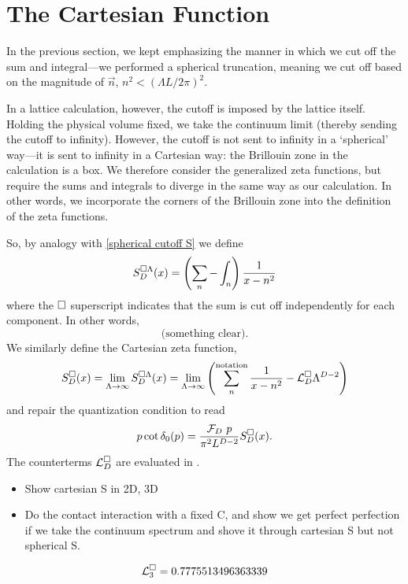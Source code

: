 \section{The Cartesian Function}\label{sec:cartesian}

In the previous section, we kept emphasizing the manner in which we cut off the sum and integral---we performed a spherical truncation, meaning we cut off based on the magnitude of $\vec{n}$, $n^2 < (\Lambda L/2\pi)^2$.

In a lattice calculation, however, the cutoff is imposed by the lattice itself.
Holding the physical volume fixed, we take the continuum limit (thereby sending the cutoff to infinity).
However, the cutoff is not sent to infinity in a `spherical' way---it is sent to infinity in a Cartesian way: the Brillouin zone in the calculation is a box.
We therefore consider the generalized zeta functions, but require the sums and integrals to diverge in the same way as our calculation.
In other words, we incorporate the corners of the Brillouin zone into the definition of the zeta functions.

So, by analogy with \eqref{spherical cutoff S} we define
\begin{equation}
        S^{\square\Lambda}_D(x) = \left(\sum_n- \int_n\right) \frac{1}{x-n^2}
\end{equation}
where the $\square$ superscript indicates that the sum is cut off independently for each component.  In other words,
\begin{equation}
    \text{(something clear)}.
\end{equation}
We similarly define the Cartesian zeta function,
\begin{equation}
    S^{\square}_D(x)
    =
    \lim_{\Lambda\rightarrow\infty} S^{\square\Lambda}_D(x)
    =
    \lim_{\Lambda\rightarrow\infty}\left( \sum_n^{\text{notation}} \frac{1}{x-n^2} - \mathcal{L}_D^\square \Lambda^{D-2}\right)
\end{equation}
and repair the quantization condition to read
\begin{equation}\label{eq:cartesian quantization}
    p \cot \delta_0(p) = \frac{\mathcal{F}_D\ p}{\pi^2 L^{D-2}} S^\square_D(x).
\end{equation}
The counterterms $\mathcal{L}_D^\square$ are evaluated in .

\begin{itemize}
    \item Show cartesian S in 2D, 3D
    \item Do the contact interaction with a fixed C, and show we get perfect perfection if we take the continuum spectrum and shove it through cartesian S but not spherical S.
\end{itemize}

\begin{equation}
    \mathcal{L}_3^\square =  0.7775513496363339
\end{equation}
